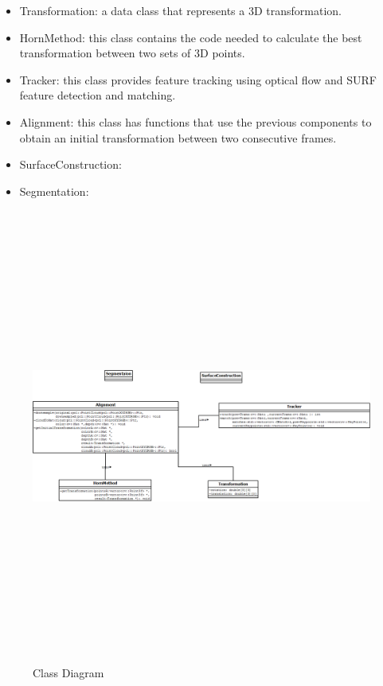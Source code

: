 \begin{itemize}
  \item Transformation: a data class that represents a 3D transformation.
  \item HornMethod: this class contains the code needed to calculate the best transformation between two sets of 3D points.
  \item Tracker: this class provides feature tracking using optical flow and 	SURF feature detection and matching.
  \item Alignment: this class has functions that use the previous components to obtain an initial transformation between two consecutive frames.
  \item SurfaceConstruction:
  \item Segmentation:

\end{itemize}

\begin{figure}[H]
\centering
\includegraphics[width=150mm,height=150mm]{System_Analysis_and_Design/class_diagram.png}
\caption{Class Diagram}
\label{fig:class_diagram}
\end{figure}

\pagebreak
